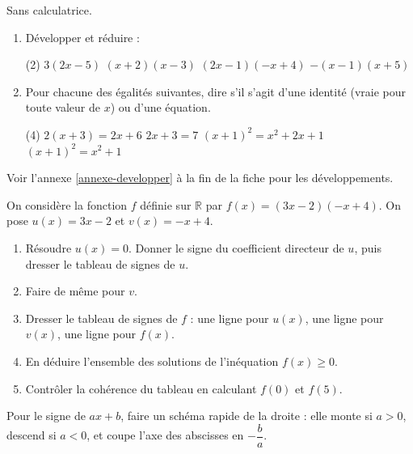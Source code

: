 \documentclass[10pt,a4paper]{article}
\begin{document}
\begin{bloc}
\begin{exo}
Sans calculatrice.
\begin{enumerate}[leftmargin=*]
    \item Développer et réduire :
    \begin{tasks}(2)
        \task \(3(2x-5)\)
        \task \((x+2)(x-3)\)
        \task \((2x-1)(-x+4)\)
        \task \(-(x-1)(x+5)\)
    \end{tasks}
    \item Pour chacune des égalités suivantes, dire s'il s'agit d'une identité (vraie pour toute valeur de \(x\)) ou d'une équation.
    \begin{tasks}(4)
        \task \(2(x+3)=2x+6\)
        \task \(2x+3=7\)
        \task \((x+1)^2=x^2+2x+1\)
        \task \((x+1)^2=x^2+1\)
    \end{tasks}
\end{enumerate}
\end{exo}

\begin{indication}
    Voir l'annexe \ref{annexe-developper} à la fin de la fiche pour les développements.
\end{indication}
\end{bloc}

\begin{bloc}
\begin{exo}[Guidé]
On considère la fonction \(f\) définie sur \(\mathbb{R}\) par \(f(x)=(3x-2)(-x+4)\). On pose \(u(x)=3x-2\) et \(v(x)=-x+4\).
\begin{enumerate}[leftmargin=*]
    \item Résoudre \(u(x)=0\). Donner le signe du coefficient directeur de \(u\), puis dresser le tableau de signes de \(u\).
    \item Faire de même pour \(v\).
    \item Dresser le tableau de signes de \(f\) : une ligne pour \(u(x)\), une ligne pour \(v(x)\), une ligne pour \(f(x)\).
    \item En déduire l'ensemble des solutions de l'inéquation \(f(x)\geq 0\).
    \item Contrôler la cohérence du tableau en calculant \(f(0)\) et \(f(5)\).
\end{enumerate}

\begin{indication}
Pour le signe de \(ax+b\), faire un schéma rapide de la droite : elle monte si \(a>0\), descend si \(a<0\), et coupe l'axe des abscisses en \(-\dfrac{b}{a}\).
\end{indication}

\end{exo}
\end{bloc}
\end{document}

